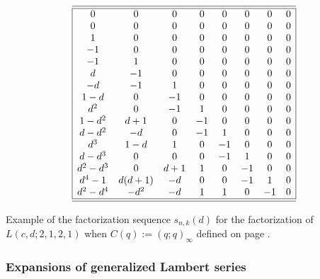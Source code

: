 \documentclass[10pt,reqno]{amsart}
\numberwithin{figure}{section}
\numberwithin{table}{section}
\theoremstyle{plain}
\numberwithin{theorem}{section}
\theoremstyle{remark}
\begin{document}
\begin{table}[ht!] 
\centering

\small 
\begin{equation*} 
\begin{array}{|cccccccc|} \hline\hline
 0 & 0 & 0 & 0 & 0 & 0 & 0 & 0 \\
 0 & 0 & 0 & 0 & 0 & 0 & 0 & 0 \\
 1 & 0 & 0 & 0 & 0 & 0 & 0 & 0 \\
 -1 & 0 & 0 & 0 & 0 & 0 & 0 & 0 \\
 -1 & 1 & 0 & 0 & 0 & 0 & 0 & 0 \\
 d & -1 & 0 & 0 & 0 & 0 & 0 & 0 \\
 -d & -1 & 1 & 0 & 0 & 0 & 0 & 0 \\
 1-d & 0 & -1 & 0 & 0 & 0 & 0 & 0 \\
 d^2 & 0 & -1 & 1 & 0 & 0 & 0 & 0 \\
 1-d^2 & d+1 & 0 & -1 & 0 & 0 & 0 & 0 \\
 d-d^2 & -d & 0 & -1 & 1 & 0 & 0 & 0 \\
 d^3 & 1-d & 1 & 0 & -1 & 0 & 0 & 0 \\
 d-d^3 & 0 & 0 & 0 & -1 & 1 & 0 & 0 \\
 d^2-d^3 & 0 & d+1 & 1 & 0 & -1 & 0 & 0 \\
 d^4-1 & d (d+1) & -d & 0 & 0 & -1 & 1 & 0 \\
 d^2-d^4 & -d^2 & -d & 1 & 1 & 0 & -1 & 0 \\
\hline\hline 
\end{array}
\end{equation*} 

\caption{Example of the factorization sequence $s_{n,k}(d)$ for the 
         factorization of $L(c, d; 2, 1, 2, 1)$ when $C(q) := (q; q)_{\infty}$ 
         defined on page \pageref{eqn_Lcd2121_factorization_thm}.} 
\label{table_GenLSeries_alphagammaEQ21} 

\end{table} 

\subsubsection{Expansions of generalized Lambert series} 
\end{document}
